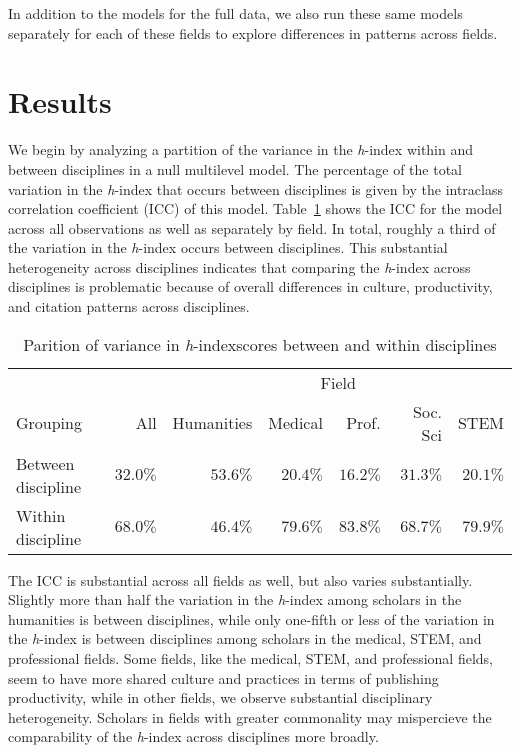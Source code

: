 \documentclass[
  10pt,
  letterpaper,
]{article}
\begin{document}
In addition to the models for the full data, we also run these same
models separately for each of these fields to explore differences in
patterns across fields.

\hypertarget{results}{%
\section{Results}\label{results}}

We begin by analyzing a partition of the variance in the \emph{h}-index
within and between disciplines in a null multilevel model. The
percentage of the total variation in the \emph{h}-index that occurs
between disciplines is given by the intraclass correlation coefficient
(ICC) of this model. Table~\ref{tbl-partition} shows the ICC for the
model across all observations as well as separately by field. In total,
roughly a third of the variation in the \emph{h}-index occurs between
disciplines. This substantial heterogeneity across disciplines indicates
that comparing the \emph{h}-index across disciplines is problematic
because of overall differences in culture, productivity, and citation
patterns across disciplines.

\hypertarget{tbl-partition}{}
\begin{longtable}{lrrrrrr}
\caption{\label{tbl-partition}Parition of variance in \emph{h}-indexscores between and within
disciplines }\tabularnewline

\toprule
 &  & \multicolumn{5}{c}{Field} \\ 
\cmidrule(lr){3-7}
Grouping & All & Humanities & Medical & Prof. & Soc. Sci & STEM \\ 
\midrule
Between discipline & $32.0\%$ & $53.6\%$ & $20.4\%$ & $16.2\%$ & $31.3\%$ & $20.1\%$ \\ 
Within discipline & $68.0\%$ & $46.4\%$ & $79.6\%$ & $83.8\%$ & $68.7\%$ & $79.9\%$ \\ 
\bottomrule
\end{longtable}

The ICC is substantial across all fields as well, but also varies
substantially. Slightly more than half the variation in the
\emph{h}-index among scholars in the humanities is between disciplines,
while only one-fifth or less of the variation in the \emph{h}-index is
between disciplines among scholars in the medical, STEM, and
professional fields. Some fields, like the medical, STEM, and
professional fields, seem to have more shared culture and practices in
terms of publishing productivity, while in other fields, we observe
substantial disciplinary heterogeneity. Scholars in fields with greater
commonality may mispercieve the comparability of the \emph{h}-index
across disciplines more broadly.
\end{document}
